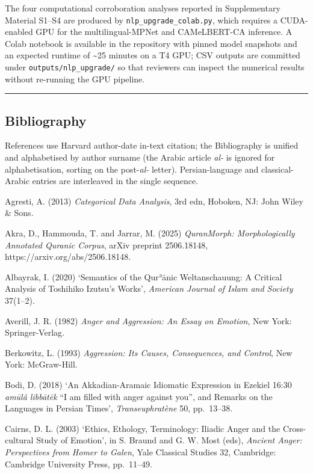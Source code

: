 \documentclass[11pt,a4paper]{article}
\begin{document}
The four computational corroboration analyses reported in Supplementary
Material S1--S4 are produced by \texttt{nlp\_upgrade\_colab.py}, which
requires a CUDA-enabled GPU for the multilingual-MPNet and CAMeLBERT-CA
inference. A Colab notebook is available in the repository with pinned
model snapshots and an expected runtime of \textasciitilde25 minutes on
a T4 GPU; CSV outputs are committed under \texttt{outputs/nlp\_upgrade/}
so that reviewers can inspect the numerical results without re-running
the GPU pipeline.

\begin{center}\rule{0.5\linewidth}{0.5pt}\end{center}

\subsection{Bibliography}\label{bibliography}

References use Harvard author-date in-text citation; the Bibliography is
unified and alphabetised by author surname (the Arabic article
\emph{al-} is ignored for alphabetisation, sorting on the
post-\emph{al-} letter). Persian-language and classical-Arabic entries
are interleaved in the single sequence.

Agresti, A. (2013) \emph{Categorical Data Analysis}, 3rd edn, Hoboken,
NJ: John Wiley \& Sons.

Akra, D., Hammouda, T. and Jarrar, M. (2025) \emph{QuranMorph:
Morphologically Annotated Quranic Corpus}, arXiv preprint 2506.18148,
https://arxiv.org/abs/2506.18148.

Albayrak, I. (2020) `Semantics of the Qurʾānic Weltanschauung: A
Critical Analysis of Toshihiko Izutsu's Works', \emph{American Journal
of Islam and Society} 37(1--2).

Averill, J. R. (1982) \emph{Anger and Aggression: An Essay on Emotion},
New York: Springer-Verlag.

Berkowitz, L. (1993) \emph{Aggression: Its Causes, Consequences, and
Control}, New York: McGraw-Hill.

Bodi, D. (2018) `An Akkadian-Aramaic Idiomatic Expression in Ezekiel
16:30 \emph{amūlâ libbātēk} ``I am filled with anger against you'', and
Remarks on the Languages in Persian Times', \emph{Transeuphratène} 50,
pp.~13--38.

Cairns, D. L. (2003) `Ethics, Ethology, Terminology: Iliadic Anger and
the Cross-cultural Study of Emotion', in S. Braund and G. W. Most (eds),
\emph{Ancient Anger: Perspectives from Homer to Galen}, Yale Classical
Studies 32, Cambridge: Cambridge University Press, pp.~11--49.
\end{document}
